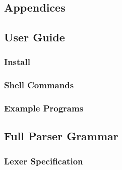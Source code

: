 \documentclass{l4proj}
\begin{document}
\begin{appendices}

\chapter{Appendices}

\section{User Guide}
\subsection{Install}
\subsection{Shell Commands}
\subsection{Example Programs}
\section{Full Parser Grammar}
\subsection{Lexer Specification}


\end{appendices}
\end{document}
